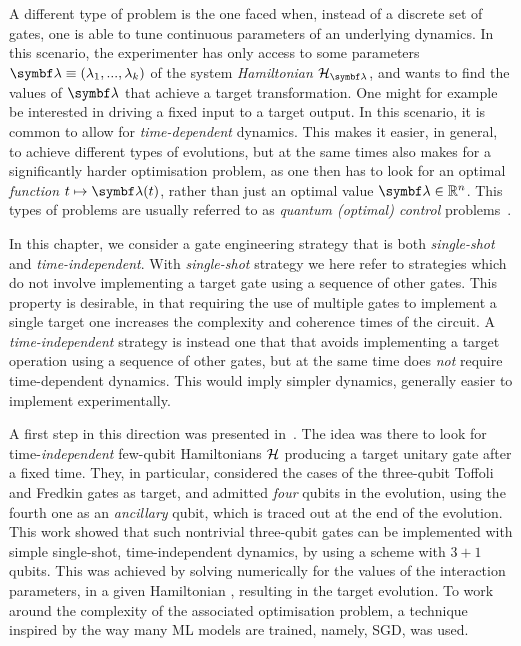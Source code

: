 A different type of problem is the one faced when, instead of a discrete set of gates, one is able to tune continuous parameters of an underlying dynamics.
In this scenario, the experimenter has only access to some parameters $\bs\lambda\equiv(\lambda_1,...,\lambda_k)$ of the system \textit{Hamiltonian} $\calH_{\bs\lambda}$, and wants to find the values of $\bs\lambda$ that achieve a target transformation.
One might for example be interested in driving a fixed input to a target output.
In this scenario, it is common to allow for \textit{time-dependent} dynamics. This makes it easier, in general, to achieve different types of evolutions, but at the same times also makes for a significantly harder optimisation problem, as one then has to look for an optimal \textit{function} $t\mapsto\bs\lambda(t)$, rather than just an optimal value $\bs\lambda\in\mathbb R^n$.
This types of problems are usually referred to as \textit{quantum (optimal) control} problems~\cite{dalessandro2007introduction,werschnik2007quantum,dong2010quantum}.

In this chapter, we consider a gate engineering strategy that is both \emph{single-shot} and \emph{time-independent}. With \emph{single-shot} strategy we here refer to strategies which do not involve implementing a target gate using a sequence of other gates. This property is desirable, in that requiring the use of multiple gates to implement a single target one increases the complexity and coherence times of the circuit.
A \emph{time-independent} strategy is instead one that that avoids implementing a target operation using a sequence of other gates, but at the same time does \emph{not} require time-dependent dynamics. This would imply simpler dynamics, generally easier to implement experimentally.

A first step in this direction was presented in~\cite{banchi2016quantum}.
The idea was there to look for time-\emph{independent} few-qubit Hamiltonians ${\mathcal{H}}$ producing a target unitary gate after a fixed time. They, in particular, considered the cases of the three-qubit Toffoli and Fredkin gates as target, and admitted \emph{four} qubits in the evolution, using the fourth one as an \emph{ancillary} qubit, which is traced out at the end of the evolution.
This work showed that such nontrivial three-qubit gates can be implemented with simple single-shot, time-independent dynamics, by using a scheme with $3+1$ qubits.
This was achieved by solving numerically for the values of the interaction parameters, in a given Hamiltonian \ansatz, resulting in the target evolution.
To work around the complexity of the associated optimisation problem, a technique inspired by the way many \ac{ML} models are trained, namely, \ac{SGD}, was used.

